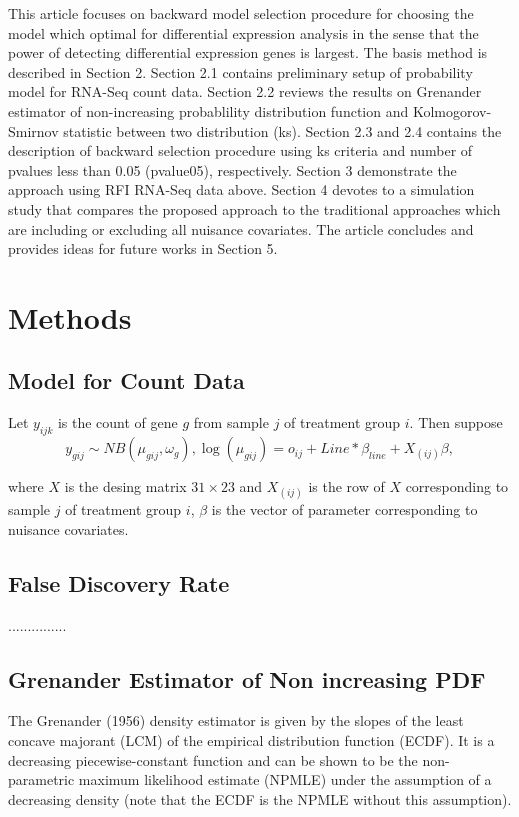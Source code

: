 \documentclass[12pt, letter]{article}\usepackage[]{graphicx}\usepackage[]{color}
\begin{document}
This article focuses on backward model selection procedure for choosing the model which optimal for differential expression analysis in the sense that the power of detecting differential expression genes is largest. The basis method is described in Section 2. Section 2.1 contains preliminary setup of probability model for RNA-Seq count data. Section 2.2 reviews the results on Grenander estimator of non-increasing probablility distribution function and Kolmogorov-Smirnov statistic between two distribution (ks). Section 2.3 and 2.4 contains the description of backward selection procedure using ks criteria and number of pvalues less than 0.05 (pvalue05), respectively. Section 3 demonstrate the approach using RFI RNA-Seq data above. Section 4 devotes to a simulation study that compares the proposed approach to the traditional approaches which are including or excluding all nuisance covariates. The article concludes and provides ideas for future works in Section 5. 
\section{\bf Methods}
\subsection{\bf Model for Count Data}
Let $y_{ijk}$ is the count of gene $g$ from sample $j$ of treatment group $i$. Then suppose 
\[
y_{gij} \sim NB(\mu_{gij}, \omega_g), \log(\mu_{gij}) = o_{ij} + Line*\beta_{line} + X_{(ij)}\beta,
\]

where $X$ is the desing matrix $31\times 23$ and $X_{(ij)}$ is the row of $X$ 
corresponding to sample $j$ of treatment group $i$, $\beta$ is the vector of parameter corresponding to  nuisance covariates.
\subsection{\bf False Discovery Rate}
...............
\subsection{\bf Grenander Estimator of Non increasing PDF}
The Grenander (1956) density estimator is given by the slopes of the least concave majorant (LCM) of the empirical distribution function (ECDF). It is a decreasing piecewise-constant function and can be shown to be the non-parametric maximum likelihood estimate (NPMLE) under the assumption of a decreasing density (note that the ECDF is the NPMLE without this assumption). 
\end{document}
